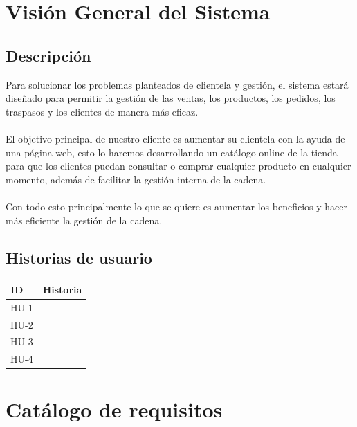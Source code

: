 \section{Visión General del Sistema}
\subsection{Descripción}
Para solucionar los problemas planteados de clientela y gestión, el sistema estará diseñado para permitir la gestión de las ventas, los productos, los pedidos, los traspasos y los clientes de manera más eficaz.
\\\\
El objetivo principal de nuestro cliente es aumentar su clientela con la ayuda de una página web, esto lo haremos desarrollando un catálogo online de la tienda para que los clientes puedan consultar o comprar cualquier producto en cualquier momento, además de facilitar la gestión interna de la cadena.
\\\\
Con todo esto principalmente lo que se quiere es aumentar los beneficios y hacer más eficiente la gestión de la cadena.

\subsection{Historias de usuario}
\begin{tabularx}{\textwidth}{|a|X|}
	\hline {}
	ID & Historia \\
	\hline
	HU-1 &  \\ \hline
	HU-2 & \\ \hline
	HU-3 &  \\ \hline
	HU-4 &  \\ \hline
\end{tabularx}

\section{Catálogo de requisitos}

